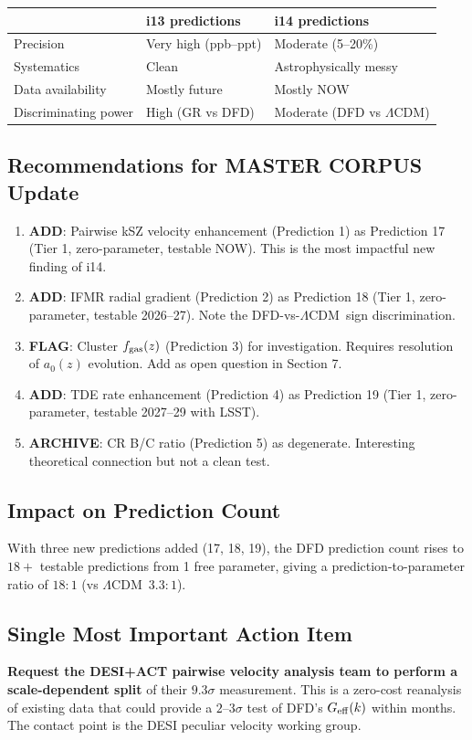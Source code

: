 \documentclass[11pt]{article}
\newcommand{\LCDM}{$\Lambda$CDM}
\begin{document}
\begin{center}
\begin{tabular}{lll}
\toprule
& i13 predictions & i14 predictions \\
\midrule
Precision & Very high (ppb--ppt) & Moderate (5--20\%) \\
Systematics & Clean & Astrophysically messy \\
Data availability & Mostly future & Mostly NOW \\
Discriminating power & High (GR vs DFD) & Moderate (DFD vs \LCDM) \\
\bottomrule
\end{tabular}
\end{center}

\subsection{Recommendations for MASTER CORPUS Update}

\begin{enumerate}
\item \textbf{ADD}: Pairwise kSZ velocity enhancement (Prediction 1) as
Prediction 17 (Tier 1, zero-parameter, testable NOW). This is the most
impactful new finding of i14.

\item \textbf{ADD}: IFMR radial gradient (Prediction 2) as Prediction 18
(Tier 1, zero-parameter, testable 2026--27). Note the DFD-vs-\LCDM\ sign
discrimination.

\item \textbf{FLAG}: Cluster $f_{\rm gas}(z)$ (Prediction 3) for investigation.
Requires resolution of $a_0(z)$ evolution. Add as open question in Section 7.

\item \textbf{ADD}: TDE rate enhancement (Prediction 4) as Prediction 19
(Tier 1, zero-parameter, testable 2027--29 with LSST).

\item \textbf{ARCHIVE}: CR B/C ratio (Prediction 5) as degenerate.
Interesting theoretical connection but not a clean test.
\end{enumerate}

\subsection{Impact on Prediction Count}

With three new predictions added (17, 18, 19), the DFD prediction count
rises to $18+$ testable predictions from 1 free parameter, giving a
prediction-to-parameter ratio of $18:1$ (vs \LCDM\ $3.3:1$).

\subsection{Single Most Important Action Item}

\textbf{Request the DESI+ACT pairwise velocity analysis team to perform
a scale-dependent split} of their $9.3\sigma$ measurement. This is a
zero-cost reanalysis of existing data that could provide a $2$--$3\sigma$
test of DFD's $G_{\rm eff}(k)$ within months. The contact point is the
DESI peculiar velocity working group.
\end{document}
